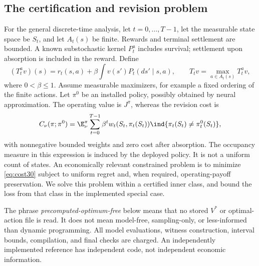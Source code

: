 \subsection{The certification and revision problem}
For the general discrete-time analysis, let $t=0,\ldots,T-1$, let the measurable state space be $S_t$, and let $A_t(s)$ be finite. Rewards and terminal settlement are bounded. A known substochastic kernel $P_t^a$ includes survival; settlement upon absorption is included in the reward. Define
\begin{equation}
 (T_t^a v)(s)=r_t(s,a)+\beta\int v(s')P_t(ds'\mid s,a),\qquad
 T_t v=\max_{a\in A_t(s)}T_t^a v,
\end{equation}
where $0<\beta\le1$. Assume measurable maximizers, for example a fixed ordering of the finite actions. Let $\pi^0$ be an installed policy, possibly obtained by neural approximation. The operating value is $J^\pi$, whereas the revision cost is
\begin{equation}\label{eq:cost30}
 C_\nu(\pi;\pi^0)=\E_\nu^\pi\sum_{t=0}^{T-1}\beta^t
 w_t(S_t,\pi_t(S_t))\ind\{\pi_t(S_t)\ne\pi_t^0(S_t)\},
\end{equation}
with nonnegative bounded weights and zero cost after absorption. The occupancy measure in this expression is induced by the deployed policy. It is not a uniform count of states. An economically relevant constrained problem is to minimize \eqref{eq:cost30} subject to uniform regret and, when required, operating-payoff preservation. We solve this problem within a certified inner class, and bound the loss from that class in the implemented special case.

The phrase \emph{precomputed-optimum-free} below means that no stored $V^*$ or optimal-action file is read. It does not mean model-free, sampling-only, or less-informed than dynamic programming. All model evaluations, witness construction, interval bounds, compilation, and final checks are charged. An independently implemented reference has independent code, not independent economic information.

